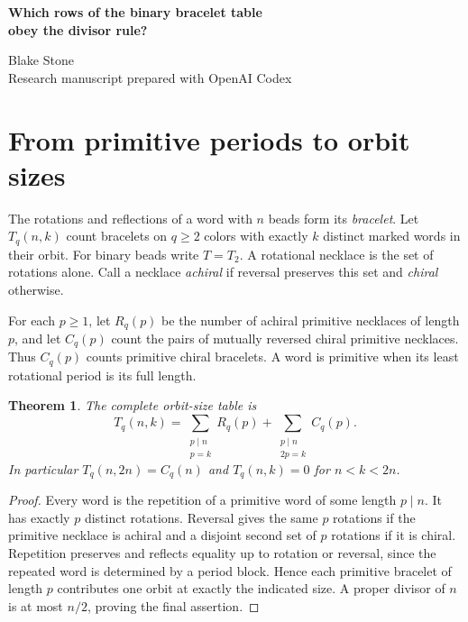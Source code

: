 \documentclass[11pt,letterpaper]{article}
\newtheorem{theorem}{Theorem}
\newcommand{\oeis}[1]{\href{https://oeis.org/A#1}{A#1}}
\begin{document}
\thispagestyle{plain}
\begin{center}
{\LARGE\bfseries Which rows of the binary bracelet table\\[0.15em] obey the divisor rule?\par}
\vspace{0.6em}
Blake Stone\\
{\small Research manuscript prepared with OpenAI Codex}
\end{center}
\begin{abstract}
Geoffrey Critzer's array \oeis{203399} counts binary bracelets by the number of distinct words obtained by rotating and reversing them. Petros Hadjicostas proposed a divisor formula and later recorded counterexamples at lengths 18 and 21. We give the corrected entry formula, identify every possible orbit size, and determine exactly which complete rows obey the original prediction. The number of agreeing rows up to $x$ is asymptotic to $7x/(4\log x)$. The counts of primitive symmetric and asymmetric bracelets used in the formula are classical.
\end{abstract}

\section{From primitive periods to orbit sizes}
The rotations and reflections of a word with $n$ beads form its \emph{bracelet}. Let $T_q(n,k)$ count bracelets on $q\ge2$ colors with exactly $k$ distinct marked words in their orbit. For binary beads write $T=T_2$. A rotational necklace is the set of rotations alone. Call a necklace \emph{achiral} if reversal preserves this set and \emph{chiral} otherwise.

For each $p\ge1$, let $R_q(p)$ be the number of achiral primitive necklaces of length $p$, and let $C_q(p)$ count the pairs of mutually reversed chiral primitive necklaces. Thus $C_q(p)$ counts primitive chiral bracelets. A word is primitive when its least rotational period is its full length.

\begin{theorem}\label{th:entries}
The complete orbit-size table is
\[
 \boxed{\displaystyle
 T_q(n,k)=\sum_{\substack{p\mid n\\p=k}}R_q(p)
             +\sum_{\substack{p\mid n\\2p=k}}C_q(p).}
\]
In particular $T_q(n,2n)=C_q(n)$ and $T_q(n,k)=0$ for $n<k<2n$.
\end{theorem}
\begin{proof}
Every word is the repetition of a primitive word of some length $p\mid n$. It has exactly $p$ distinct rotations. Reversal gives the same $p$ rotations if the primitive necklace is achiral and a disjoint second set of $p$ rotations if it is chiral. Repetition preserves and reflects equality up to rotation or reversal, since the repeated word is determined by a period block. Hence each primitive bracelet of length $p$ contributes one orbit at exactly the indicated size. A proper divisor of $n$ is at most $n/2$, proving the final assertion.
\end{proof}
\end{document}
